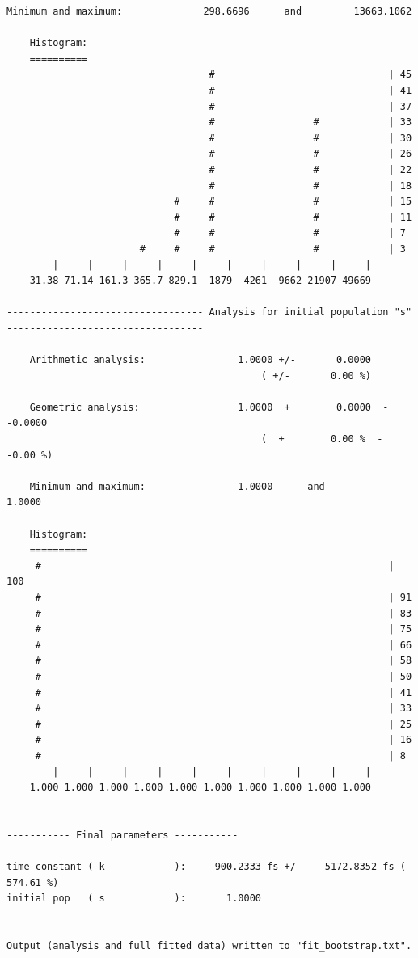 \documentclass[a4paper,11pt,DIV=15,openany]{scrbook}
\begin{document}
\begin{oframed}
\begin{Verbatim}[commandchars=\\\{\}]
    Minimum and maximum:              298.6696      and         13663.1062

    Histogram:
    ==========
                                   #                              | 45
                                   #                              | 41
                                   #                              | 37
                                   #                 #            | 33
                                   #                 #            | 30
                                   #                 #            | 26
                                   #                 #            | 22
                                   #                 #            | 18
                             #     #                 #            | 15
                             #     #                 #            | 11
                             #     #                 #            | 7
                       #     #     #                 #            | 3
        |     |     |     |     |     |     |     |     |     |  
    31.38 71.14 161.3 365.7 829.1  1879  4261  9662 21907 49669

---------------------------------- Analysis for initial population "s" ----------------------------------

    Arithmetic analysis:                1.0000 +/-       0.0000
                                            ( +/-       0.00 %)

    Geometric analysis:                 1.0000  +        0.0000  -       -0.0000
                                            (  +        0.00 %  -       -0.00 %)

    Minimum and maximum:                1.0000      and             1.0000

    Histogram:
    ==========
     #                                                            | 100
     #                                                            | 91
     #                                                            | 83
     #                                                            | 75
     #                                                            | 66
     #                                                            | 58
     #                                                            | 50
     #                                                            | 41
     #                                                            | 33
     #                                                            | 25
     #                                                            | 16
     #                                                            | 8
        |     |     |     |     |     |     |     |     |     |  
    1.000 1.000 1.000 1.000 1.000 1.000 1.000 1.000 1.000 1.000


----------- Final parameters -----------

time constant ( k            ):     900.2333 fs +/-    5172.8352 fs ( 574.61 %)
initial pop   ( s            ):       1.0000


Output (analysis and full fitted data) written to "fit_bootstrap.txt".
\end{Verbatim}
\end{oframed}
\end{document}
